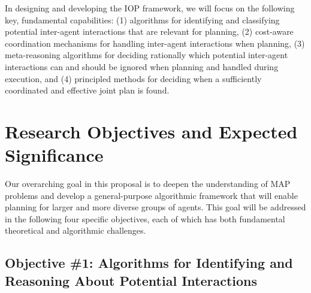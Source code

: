 \documentclass[11pt]{article}
\begin{document}
In designing and developing the IOP framework, we will focus on the following key, fundamental capabilities: 
(1) algorithms for identifying and classifying potential inter-agent interactions that are relevant for planning,
(2) cost-aware coordination mechanisms for handling inter-agent interactions when planning,
(3) meta-reasoning algorithms for deciding rationally which potential inter-agent interactions can and should be ignored when planning and handled during execution, and (4) principled methods for deciding when a sufficiently coordinated and effective joint plan is found. 


\section{Research Objectives and Expected Significance}
Our overarching goal in this proposal is to deepen the understanding of MAP problems and develop a general-purpose algorithmic framework that will enable planning for larger and more diverse groups of agents. 
This goal will be addressed in the following four specific objectives, each of which has both fundamental theoretical and algorithmic challenges.

\subsection{Objective \#1: Algorithms for Identifying and Reasoning About Potential Interactions}

\end{document}
